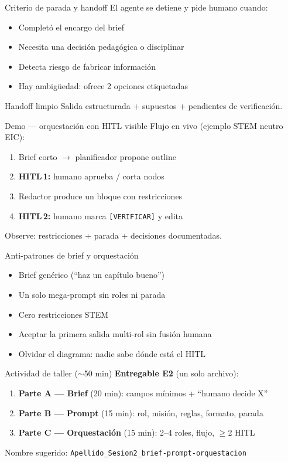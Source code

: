 \documentclass[aspectratio=169,11pt]{beamer}
\begin{document}
\begin{frame}{Criterio de parada y handoff}
El agente se detiene y pide humano cuando:
\begin{itemize}
\item Completó el encargo del brief
\item Necesita una decisión pedagógica o disciplinar
\item Detecta riesgo de fabricar información
\item Hay ambigüedad: ofrece 2 opciones etiquetadas
\end{itemize}
\begin{block}{Handoff limpio}
Salida estructurada + supuestos + pendientes de verificación.
\end{block}
\end{frame}

\begin{frame}{Demo --- orquestación con HITL visible}
Flujo en vivo (ejemplo STEM neutro EIC):
\begin{enumerate}
\item Brief corto $\rightarrow$ planificador propone outline
\item \textbf{HITL\,1:} humano aprueba / corta nodos
\item Redactor produce un bloque con restricciones
\item \textbf{HITL\,2:} humano marca \texttt{[VERIFICAR]} y edita
\end{enumerate}
Observe: restricciones + parada + decisiones documentadas.
\end{frame}

\begin{frame}{Anti-patrones de brief y orquestación}
\begin{itemize}
\item Brief genérico (``haz un capítulo bueno'')
\item Un solo mega-prompt sin roles ni parada
\item Cero restricciones STEM
\item Aceptar la primera salida multi-rol sin fusión humana
\item Olvidar el diagrama: nadie sabe dónde está el HITL
\end{itemize}
\end{frame}

\begin{frame}{Actividad de taller ($\sim$50 min)}
\textbf{Entregable E2} (un solo archivo):
\begin{enumerate}
\item \textbf{Parte A --- Brief} (20 min): campos mínimos + ``humano decide X''
\item \textbf{Parte B --- Prompt} (15 min): rol, misión, reglas, formato, parada
\item \textbf{Parte C --- Orquestación} (15 min): 2--4 roles, flujo, $\geq$2 HITL
\end{enumerate}
Nombre sugerido: \texttt{Apellido\_Sesion2\_brief-prompt-orquestacion}
\end{frame}
\end{document}
